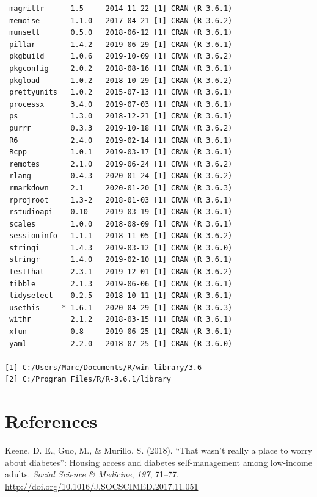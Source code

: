 \documentclass [11pt, proquest] {uwthesis}[2015/03/03]
\begin{document}
\begin{verbatim}
 magrittr      1.5     2014-11-22 [1] CRAN (R 3.6.1)                       
 memoise       1.1.0   2017-04-21 [1] CRAN (R 3.6.2)                       
 munsell       0.5.0   2018-06-12 [1] CRAN (R 3.6.1)                       
 pillar        1.4.2   2019-06-29 [1] CRAN (R 3.6.1)                       
 pkgbuild      1.0.6   2019-10-09 [1] CRAN (R 3.6.2)                       
 pkgconfig     2.0.2   2018-08-16 [1] CRAN (R 3.6.1)                       
 pkgload       1.0.2   2018-10-29 [1] CRAN (R 3.6.2)                       
 prettyunits   1.0.2   2015-07-13 [1] CRAN (R 3.6.1)                       
 processx      3.4.0   2019-07-03 [1] CRAN (R 3.6.1)                       
 ps            1.3.0   2018-12-21 [1] CRAN (R 3.6.1)                       
 purrr         0.3.3   2019-10-18 [1] CRAN (R 3.6.2)                       
 R6            2.4.0   2019-02-14 [1] CRAN (R 3.6.1)                       
 Rcpp          1.0.1   2019-03-17 [1] CRAN (R 3.6.1)                       
 remotes       2.1.0   2019-06-24 [1] CRAN (R 3.6.2)                       
 rlang         0.4.3   2020-01-24 [1] CRAN (R 3.6.2)                       
 rmarkdown     2.1     2020-01-20 [1] CRAN (R 3.6.3)                       
 rprojroot     1.3-2   2018-01-03 [1] CRAN (R 3.6.1)                       
 rstudioapi    0.10    2019-03-19 [1] CRAN (R 3.6.1)                       
 scales        1.0.0   2018-08-09 [1] CRAN (R 3.6.1)                       
 sessioninfo   1.1.1   2018-11-05 [1] CRAN (R 3.6.2)                       
 stringi       1.4.3   2019-03-12 [1] CRAN (R 3.6.0)                       
 stringr       1.4.0   2019-02-10 [1] CRAN (R 3.6.1)                       
 testthat      2.3.1   2019-12-01 [1] CRAN (R 3.6.2)                       
 tibble        2.1.3   2019-06-06 [1] CRAN (R 3.6.1)                       
 tidyselect    0.2.5   2018-10-11 [1] CRAN (R 3.6.1)                       
 usethis     * 1.6.1   2020-04-29 [1] CRAN (R 3.6.3)                       
 withr         2.1.2   2018-03-15 [1] CRAN (R 3.6.1)                       
 xfun          0.8     2019-06-25 [1] CRAN (R 3.6.1)                       
 yaml          2.2.0   2018-07-25 [1] CRAN (R 3.6.0)                       

[1] C:/Users/Marc/Documents/R/win-library/3.6
[2] C:/Program Files/R/R-3.6.1/library
\end{verbatim}
\backmatter

\chapter*{References}\label{references}


\noindent

\setlength{\parindent}{-0.20in} \setlength{\leftskip}{0.20in}
\setlength{\parskip}{8pt}

\hypertarget{refs}{}
\hypertarget{ref-Keene2018}{}
Keene, D. E., Guo, M., \& Murillo, S. (2018). ``That wasn't really a
place to worry about diabetes'': Housing access and diabetes
self-management among low-income adults. \emph{Social Science \&
Medicine}, \emph{197}, 71--77.
\url{http://doi.org/10.1016/J.SOCSCIMED.2017.11.051}
\end{document}
